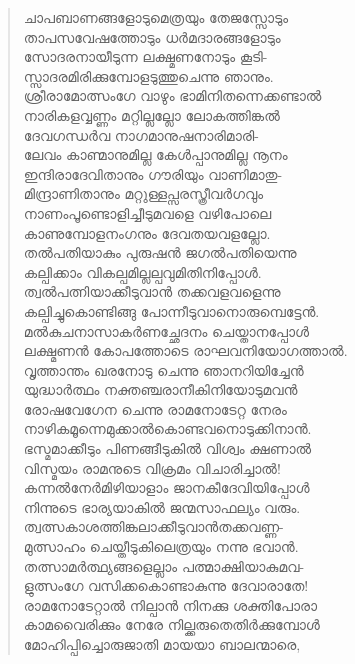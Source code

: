 \begin{verse}
ചാപബാണങ്ങളോടുമെത്രയും തേജസ്സോടും\\
താപസവേഷത്തോടും ധര്‍മദാരങ്ങളോടും\\
സോദരനായീടുന്ന ലക്ഷ്മണനോടും കൂടി-\\
സ്സാദരമിരിക്കുമ്പോളടുത്തുചെന്നു ഞാനും.\\
ശ്രീരാമോത്സംഗേ വാഴും ഭാമിനിതന്നെക്കണ്ടാല്‍\\
നാരികളവ്വണ്ണം മറ്റില്ലല്ലോ ലോകത്തിങ്കല്‍\\
ദേവഗന്ധര്‍വ നാഗമാനുഷനാരിമാരി-\\
ലേവം കാണ്മാനുമില്ല കേള്‍പ്പാനുമില്ല നൂനം\\
ഇന്ദിരാദേവിതാനും ഗൗരിയും വാണിമാതു-\\
മിന്ദ്രാണിതാനും മറ്റുള്ളപ്സരസ്ത്രീവര്‍ഗവും\\
നാണംപൂണ്ടൊളിച്ചീടുമവളെ വഴിപോലെ\\
കാണുമ്പോളനംഗനും ദേവതയവളല്ലോ.\\
തല്‍പതിയാകും പുരുഷന്‍ ജഗല്‍പതിയെന്നു\\
കല്പിക്കാം വികല്പമില്ലല്പവുമിതിനിപ്പോള്‍.\\
ത്വല്‍പത്നിയാക്കീടുവാന്‍ തക്കവളവളെന്നു\\
കല്പിച്ചുകൊണ്ടിങ്ങു പോന്നീടുവാനൊരുമ്പെട്ടേന്‍.\\
മല്‍കുചനാസാകര്‍ണച്ഛേദനം ചെയ്താനപ്പോള്‍\\
ലക്ഷ്മണന്‍ കോപത്തോടെ രാഘവനിയോഗത്താല്‍.\\
വൃത്താന്തം ഖരനോടു ചെന്നു ഞാനറിയിച്ചേന്‍\\
യുദ്ധാര്‍ത്ഥം നക്തഞ്ചരാനീകിനിയോടുമവന്‍\\
രോഷവേഗേന ചെന്നു രാമനോടേറ്റ നേരം\\
നാഴികമൂന്നെമുക്കാല്‍കൊണ്ടവനൊടുക്കിനാന്‍.\\
ഭസ്മമാക്കീടും പിണങ്ങീടുകില്‍ വിശ്വം ക്ഷണാല്‍\\
വിസ്മയം രാമനുടെ വിക്രമം വിചാരിച്ചാല്‍!\\
കന്നല്‍നേര്‍മിഴിയാളാം ജാനകീദേവിയിപ്പോള്‍\\
നിന്നുടെ ഭാര്യയാകില്‍ ജന്മസാഫല്യം വരും.\\
ത്വത്സകാശത്തിങ്കലാക്കീടുവാന്‍തക്കവണ്ണ-\\
മുത്സാഹം ചെയ്തീടുകിലെത്രയും നന്നു ഭവാന്‍.\\
തത്സാമര്‍ത്ഥ്യങ്ങളെല്ലാം പത്മാക്ഷിയാകുമവ-\\
ളുത്സംഗേ വസിക്കകൊണ്ടാകുന്നു ദേവാരാതേ!\\
രാമനോടേറ്റാല്‍ നില്പാന്‍ നിനക്കു ശക്തിപോരാ\\
കാമവൈരിക്കും നേരേ നില്ക്കരുതെതിര്‍ക്കുമ്പോള്‍\\
മോഹിപ്പിച്ചൊരുജാതി മായയാ ബാലന്മാരെ,\\

\end{verse}
